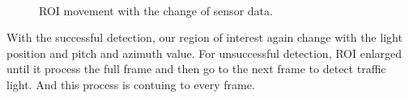 \begin{figure}[!ht]
\centering
{}
\\

\caption{ROI movement with the change of sensor data.}
\label{f:rec_mv}
\end{figure}


With the successful detection, our region of interest again change with the light position and pitch and azimuth value.
For unsuccessful detection, ROI enlarged until it process the full frame and then go to the next frame to detect traffic light.
And this process is contuing to every frame.

